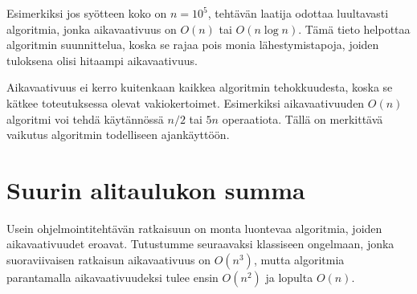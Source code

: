 Esimerkiksi jos syötteen koko on $n=10^5$,
tehtävän laatija odottaa luultavasti
algoritmia, jonka aikavaativuus on $O(n)$ tai $O(n \log n)$.
Tämä tieto helpottaa algoritmin suunnittelua,
koska se rajaa pois monia lähestymistapoja,
joiden tuloksena olisi hitaampi aikavaativuus.

Aikavaativuus ei kerro kuitenkaan kaikkea algoritmin
tehokkuudesta, koska se kätkee toteutuksessa olevat
vakiokertoimet. Esimerkiksi aikavaativuuden $O(n)$
algoritmi voi tehdä käytännössä $n/2$ tai $5n$ operaatiota.
Tällä on merkittävä vaikutus algoritmin
todelliseen ajankäyttöön.

\section{Suurin alitaulukon summa}


Usein ohjelmointitehtävän ratkaisuun on monta
luontevaa algoritmia, joiden aikavaativuudet eroavat.
Tutustumme seuraavaksi klassiseen ongelmaan,
jonka suoraviivaisen ratkaisun aikavaativuus on $O(n^3)$,
mutta algoritmia parantamalla aikavaativuudeksi
tulee ensin $O(n^2)$ ja lopulta $O(n)$.

